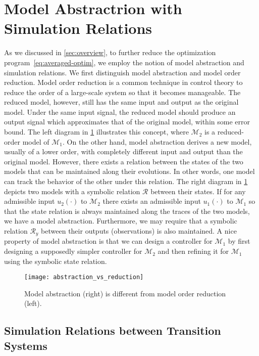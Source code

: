 \section{Model Abstractrion with Simulation Relations}
\label{sec:abstraction}

As we discussed in \cref{sec:overview}, to further reduce the optimization program~\eqref{eq:averaged-optim}, we employ the notion of model abstraction and simulation relations.
We first distinguish model abstraction and model order reduction.
Model order reduction is a common technique in control theory to reduce the order of a large-scale system so that it becomes manageable. The reduced model, however, still has
the same input and output as the original model. Under the same input signal,
the reduced model should produce an output signal which approximates that of
the original model, within some error bound. The left diagram in
\cref{fig:reduction-vs-abstraction} illustrates this concept, where
$\mathcal{M}_2$ is a reduced-order model of $\mathcal{M}_1$. On the other
hand, model abstraction derives a new model, usually of a lower order, with
completely different input and output than the original model. However, there
exists a relation between the states of the two models that can be maintained
along their evolutions. In other words, one model can track the behavior of
the other under this relation. The right diagram in
\cref{fig:reduction-vs-abstraction} depicts two models with a symbolic
relation $\mathcal{R}$ between their states. If for any admissible input $u_2
(\cdot)$ to $\mathcal{M}_2$ there exists an admissible input $u_1 (\cdot)$ to
$\mathcal{M}_1$ so that the state relation is always maintained along the
traces of the two models, we have a model abstraction. Furthermore, we may
require that a symbolic relation $\mathcal{R}_y$ between their outputs (observations) is also
maintained. A nice property of model abstraction is that we can design a
controller for $\mathcal{M}_1$ by first designing a supposedly simpler
controller for $\mathcal{M}_2$ and then refining it for $\mathcal{M}_1$ using
the symbolic state relation.

\begin{figure}[tb]
\texttt{[image: abstraction\_vs\_reduction]}
\caption{\label{fig:reduction-vs-abstraction}Model abstraction (right) is
  different from model order reduction (left).}
\end{figure}

\subsection{Simulation Relations between Transition
Systems}\label{sec:abstraction:simulation}

